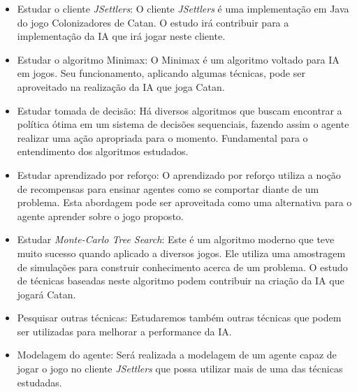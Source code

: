     \begin{itemize}

        \item Estudar o cliente \textit{JSettlers}: O cliente \textit{JSettlers} é uma implementação em Java do jogo Colonizadores de Catan. O estudo irá contribuir para a implementação da IA que irá jogar neste cliente.
   
        \item Estudar o algoritmo Minimax: O Minimax é um algoritmo voltado para IA em jogos. Seu funcionamento, aplicando algumas técnicas, pode ser aproveitado na realização da IA que joga Catan.
   
        \item Estudar tomada de decisão: Há diversos algoritmos que buscam encontrar a política ótima em um sistema de decisões sequenciais, fazendo assim o agente realizar uma ação apropriada para o momento. Fundamental para o entendimento dos algoritmos estudados.
   
        \item Estudar aprendizado por reforço: O aprendizado por reforço utiliza a noção de recompensas para ensinar agentes como se comportar diante de um problema. Esta abordagem pode ser aproveitada como uma alternativa para o agente aprender sobre o jogo proposto.
        
        \item Estudar \textit{Monte-Carlo Tree Search}: Este é um algoritmo moderno que teve muito sucesso quando aplicado a diversos jogos. Ele utiliza uma amostragem de simulações para construir conhecimento acerca de um problema. O estudo de técnicas baseadas neste algoritmo podem contribuir na criação da IA que jogará Catan.
        
        \item Pesquisar outras técnicas: Estudaremos também outras técnicas que podem ser utilizadas para melhorar a performance da IA.
            
        \item Modelagem do agente: Será realizada a modelagem de um agente capaz de jogar o jogo no cliente \textit{JSettlers} que possa utilizar mais de uma das técnicas estudadas.
   
    \end{itemize}


